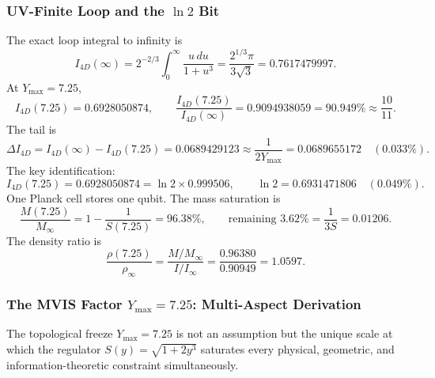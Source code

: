 \documentclass[a4paper,7pt,oneside,openany]{book}
\begin{document}
\subsubsection{UV-Finite Loop and the \(\ln 2\) Bit}
\label{sssec:ln2_bit}
The exact loop integral to infinity is
\begin{equation}
I_{4D}(\infty) = 2^{-2/3}\int_0^\infty \frac{u\,du}{1+u^3} = \frac{2^{1/3}\pi}{3\sqrt{3}} = 0.7617479997.
\label{eq:I_inf}
\end{equation}
At \(Y_{\max} = 7.25\),
\begin{equation}
I_{4D}(7.25) = 0.6928050874, \qquad \frac{I_{4D}(7.25)}{I_{4D}(\infty)} = 0.9094938059 = 90.949\% \approx \frac{10}{11}.
\label{eq:I_725}
\end{equation}
The tail is
\begin{equation}
\Delta I_{4D} = I_{4D}(\infty) - I_{4D}(7.25) = 0.0689429123 \approx \frac{1}{2Y_{\max}} = 0.0689655172 \quad (0.033\%).
\label{eq:tail}
\end{equation}
The key identification:
\begin{equation}
I_{4D}(7.25) = 0.6928050874 = \ln 2 \times 0.999506, \qquad \ln 2 = 0.6931471806 \quad (0.049\%).
\label{eq:ln2_identification}
\end{equation}
One Planck cell stores one qubit. The mass saturation is
\begin{equation}
\frac{M(7.25)}{M_\infty} = 1 - \frac{1}{S(7.25)} = 96.38\%, \qquad \text{remaining } 3.62\% = \frac{1}{3S} = 0.01206.
\label{eq:mass_saturation}
\end{equation}
The density ratio is
\begin{equation}
\frac{\rho(7.25)}{\rho_\infty} = \frac{M/M_\infty}{I/I_\infty} = \frac{0.96380}{0.90949} = 1.0597.
\label{eq:density_ratio}
\end{equation}

\subsubsection{The MVIS Factor \(Y_{\max} = 7.25\): Multi-Aspect Derivation}
\label{sssec:mvis_derivation}

The topological freeze \(Y_{\max} = 7.25\) is not an assumption but the unique scale at which the regulator \(S(y) = \sqrt{1+2y^3}\) saturates every physical, geometric, and information-theoretic constraint simultaneously.
\end{document}
